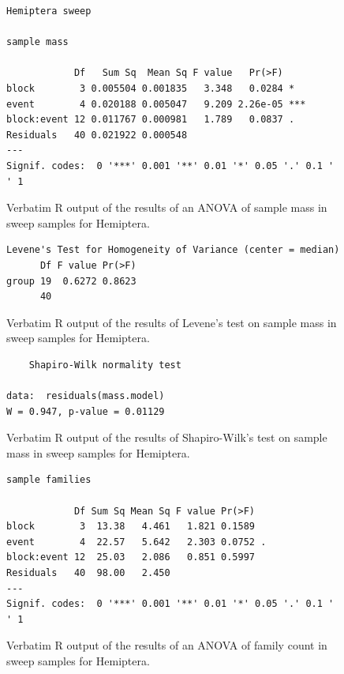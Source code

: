\documentclass[10pt,letterpaper,twocolumn]{article}
\begin{document}
\begin{figure}[h]
	\lstset{numbers=left}
	\lstset{xleftmargin=5mm,framexleftmargin=5mm}
	\begin{lstlisting}
Hemiptera sweep 

sample mass 

            Df   Sum Sq  Mean Sq F value   Pr(>F)    
block        3 0.005504 0.001835   3.348   0.0284 *  
event        4 0.020188 0.005047   9.209 2.26e-05 ***
block:event 12 0.011767 0.000981   1.789   0.0837 .  
Residuals   40 0.021922 0.000548                     
---
Signif. codes:  0 '***' 0.001 '**' 0.01 '*' 0.05 '.' 0.1 ' ' 1
	\end{lstlisting}
	\caption{Verbatim R output of the results of an ANOVA of sample mass in sweep samples for Hemiptera.}
	\label{fig:sweep_hemiptera_mass_anova}
	\smallskip
	\nointerlineskip
	\hrulefill
\end{figure}

\begin{figure}[h]
	\lstset{numbers=left}
	\lstset{xleftmargin=5mm,framexleftmargin=5mm}
	\begin{lstlisting}
Levene's Test for Homogeneity of Variance (center = median)
      Df F value Pr(>F)
group 19  0.6272 0.8623
      40               
	\end{lstlisting}
	\caption{Verbatim R output of the results of Levene's test on sample mass in sweep samples for Hemiptera.}
	\label{fig:sweep_hemiptera_mass_levene}
	\smallskip
	\nointerlineskip
	\hrulefill
\end{figure}

\begin{figure}[h]
	\lstset{numbers=left}
	\lstset{xleftmargin=5mm,framexleftmargin=5mm}
	\begin{lstlisting}
	Shapiro-Wilk normality test

data:  residuals(mass.model)
W = 0.947, p-value = 0.01129
	\end{lstlisting}
	\caption{Verbatim R output of the results of Shapiro-Wilk's test on sample mass in sweep samples for Hemiptera.}
	\label{fig:sweep_hemiptera_mass_shapiro}
	\smallskip
	\nointerlineskip
	\hrulefill
\end{figure}

\begin{figure}[h]
	\lstset{numbers=left}
	\lstset{xleftmargin=5mm,framexleftmargin=5mm}
	\begin{lstlisting}
sample families 

            Df Sum Sq Mean Sq F value Pr(>F)  
block        3  13.38   4.461   1.821 0.1589  
event        4  22.57   5.642   2.303 0.0752 .
block:event 12  25.03   2.086   0.851 0.5997  
Residuals   40  98.00   2.450                 
---
Signif. codes:  0 '***' 0.001 '**' 0.01 '*' 0.05 '.' 0.1 ' ' 1
	\end{lstlisting}
	\caption{Verbatim R output of the results of an ANOVA of family count in sweep samples for Hemiptera.}
	\label{fig:sweep_hemiptera_family_anova}
	\smallskip
	\nointerlineskip
	\hrulefill
\end{figure}
\end{document}

